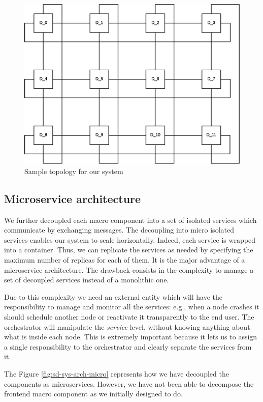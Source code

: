 \begin{figure}[H]
  \centering
  \includegraphics[scale=0.5,keepaspectratio]
    {images/solution/topology.eps}
  \caption{Sample topology for our system}
  \label{fig:sd-sys-arch-topology}
\end{figure}


\subsection{Microservice architecture}

We further decoupled each macro component into a set of isolated services
which communicate by exchanging messages. The decoupling into micro isolated
services enables our system to scale horizontally. Indeed, each service is wrapped
into a container. Thus, we can replicate
the services as needed by specifying the maximum number of replicas
for each of them.
It is the major advantage
of a microservice architecture.
The drawback consists in the complexity to manage a set of decoupled
services instead of a monolithic one.


Due to this complexity
we need an external entity which
will have the responsibility to manage and monitor all the services:
e.g., when a node crashes it should schedule another node or reactivate it
transparently to the end user.
The orchestrator will
manipulate the \textit{service} level, without knowing anything about
what is inside each node. This is extremely important because it
lets us to assign
a single responsibility to the orchestrator and clearly
separate the services from it.


The Figure \ref{fig:sd-sys-arch-micro} represents how we have decoupled
the components as microservices. However, we have not been able to decompose the
frontend macro component as we initially designed to do.

